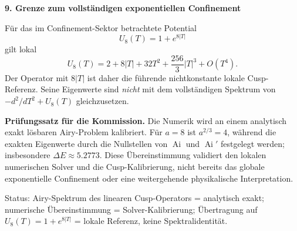\documentclass[10pt,a4paper]{article}
\begin{document}
\textbf{9. Grenze zum vollständigen exponentiellen Confinement}

Für das im Confinement-Sektor betrachtete Potential
\[
U_8(T)=1+e^{8|T|}
\]
gilt lokal
\[
U_8(T)=2+8|T|+32T^2+\frac{256}{3}|T|^3+O(T^4).
\]
Der Operator mit $8|T|$ ist daher die führende nichtkonstante lokale Cusp-Referenz. Seine Eigenwerte sind \emph{nicht} mit dem vollständigen Spektrum von $-d^2/dT^2+U_8(T)$ gleichzusetzen.

\begin{proofbox}
\textbf{Prüfungssatz für die Kommission.} Die Numerik wird an einem analytisch exakt lösbaren Airy-Problem kalibriert. Für $a=8$ ist $a^{2/3}=4$, während die exakten Eigenwerte durch die Nullstellen von $\operatorname{Ai}$ und $\operatorname{Ai}'$ festgelegt werden; insbesondere $\Delta E\approx5.2773$. Diese Übereinstimmung validiert den lokalen numerischen Solver und die Cusp-Kalibrierung, nicht bereits das globale exponentielle Confinement oder eine weitergehende physikalische Interpretation.
\end{proofbox}

\vfill
{\footnotesize Status: Airy-Spektrum des linearen Cusp-Operators = analytisch exakt; numerische Übereinstimmung = Solver-Kalibrierung; Übertragung auf $U_8(T)=1+e^{8|T|}$ = lokale Referenz, keine Spektralidentität.}
\end{document}
